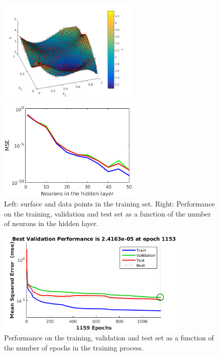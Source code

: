 \documentclass[pdftex,11pt,a4paper]{article}
\begin{document}
\begin{figure}[tbh]
\centering
\begin{minipage}{0.4\textwidth}
\includegraphics[height=5cm]{figs/train_surface.png}
\end{minipage}\quad
\begin{minipage}{0.4\textwidth}
\includegraphics[height=5cm]{figs/performance_val.png}
\end{minipage}
\caption{Left: surface and data points in the training set. Right: Performance on the training, validation and test set as a function of the number of neurons in the hidden layer. \label{fig:performance_val}}
\end{figure}

\begin{figure}[tbh]
\centering
\includegraphics[height=5cm]{figs/MSE_final.png}
\caption{Performance on the training, validation and test set as a function of the number of epochs in the training process. \label{fig:MSE_final}}
\end{figure}
\end{document}
